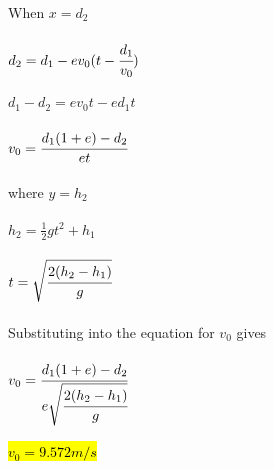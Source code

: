 \documentclass{article}
\begin{document}
When $x = d_2$ \\ \\
$d_2 = d_1 - e v_0(t - \cfrac{d_1}{v_0})$\\ \\
$d_1 - d_2 = e v_0 t - e d_1 t$\\ \\
$v_0 = \cfrac{d_1(1 + e) - d_2}{e t}$\\ \\
where $y = h_2$ \\ \\
$h_2 = \frac{1}{2}gt^2 + h_1$\\ \\
$t = \sqrt{\cfrac{2(h_2 - h_1)}{g}}$\\ \\
Substituting into the equation for $v_0$ gives\\ \\
$v_0 = \cfrac{d_1(1 + e) - d_2}{e\sqrt{\cfrac{2(h_2 - h_1)}{g}}}$\\ \\
\hl{$v_0 = 9.572 m/s$}
\end{document}
